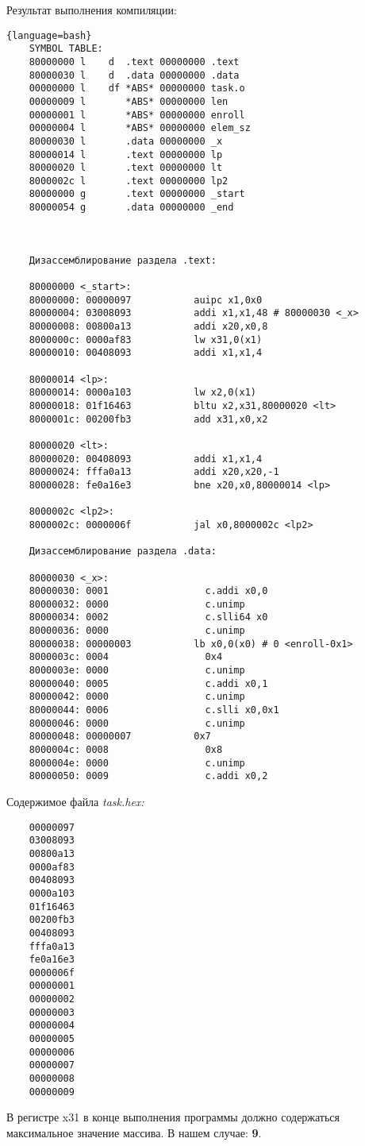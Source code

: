 Результат выполнения компиляции:
\begin{lstlisting}{language=bash}
    SYMBOL TABLE:
    80000000 l    d  .text 00000000 .text
    80000030 l    d  .data 00000000 .data
    00000000 l    df *ABS* 00000000 task.o
    00000009 l       *ABS* 00000000 len
    00000001 l       *ABS* 00000000 enroll
    00000004 l       *ABS* 00000000 elem_sz
    80000030 l       .data 00000000 _x
    80000014 l       .text 00000000 lp
    80000020 l       .text 00000000 lt
    8000002c l       .text 00000000 lp2
    80000000 g       .text 00000000 _start
    80000054 g       .data 00000000 _end
    
    
    
    Дизассемблирование раздела .text:
    
    80000000 <_start>:
    80000000: 00000097           auipc x1,0x0
    80000004: 03008093           addi x1,x1,48 # 80000030 <_x>
    80000008: 00800a13           addi x20,x0,8
    8000000c: 0000af83           lw x31,0(x1)
    80000010: 00408093           addi x1,x1,4
    
    80000014 <lp>:
    80000014: 0000a103           lw x2,0(x1)
    80000018: 01f16463           bltu x2,x31,80000020 <lt>
    8000001c: 00200fb3           add x31,x0,x2
    
    80000020 <lt>:
    80000020: 00408093           addi x1,x1,4
    80000024: fffa0a13           addi x20,x20,-1
    80000028: fe0a16e3           bne x20,x0,80000014 <lp>
    
    8000002c <lp2>:
    8000002c: 0000006f           jal x0,8000002c <lp2>
    
    Дизассемблирование раздела .data:
    
    80000030 <_x>:
    80000030: 0001                 c.addi x0,0
    80000032: 0000                 c.unimp
    80000034: 0002                 c.slli64 x0
    80000036: 0000                 c.unimp
    80000038: 00000003           lb x0,0(x0) # 0 <enroll-0x1>
    8000003c: 0004                 0x4
    8000003e: 0000                 c.unimp
    80000040: 0005                 c.addi x0,1
    80000042: 0000                 c.unimp
    80000044: 0006                 c.slli x0,0x1
    80000046: 0000                 c.unimp
    80000048: 00000007           0x7
    8000004c: 0008                 0x8
    8000004e: 0000                 c.unimp
    80000050: 0009                 c.addi x0,2

\end{lstlisting}

Содержимое файла \textit{task.hex:}
\begin{lstlisting}
    00000097
    03008093
    00800a13
    0000af83
    00408093
    0000a103
    01f16463
    00200fb3
    00408093
    fffa0a13
    fe0a16e3
    0000006f
    00000001
    00000002
    00000003
    00000004
    00000005
    00000006
    00000007
    00000008
    00000009    
\end{lstlisting}

В регистре x31 в конце выполнения программы должно содержаться максимальное значение массива. В нашем случае: \textbf{9}.
